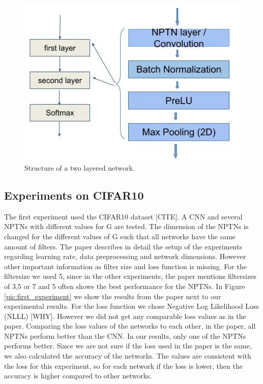 \documentclass{llncs}
\begin{document}
\begin{figure}
	\begin{center}
	\includegraphics[scale=0.35]{result_images/network_structure.jpg}
	\caption{Structure of a two layered network.}
	\label{pic:network_structure}
	\end{center}
\end{figure}

\subsection{Experiments on CIFAR10}
The first experiment used the CIFAR10 dataset [CITE]. A CNN and several NPTNs with different values for G are tested. The dimension of the NPTNs is changed for the different values of G such that all networks have the same amount of filters.
The paper describes in detail the setup of the experiments regarding learning rate, data preprocessing and network dimensions. However other important information as filter size and loss function is missing. 
For the filtersize we used 5, since in the other experiments, the paper mentions  filtersizes of 3,5 or 7 and 5 often shows the best performance for the NPTNs. 
In Figure \ref{pic:first_experiment} we show the results from the paper next to our experimental results. For the loss function we chose Negative Log Likelihood Loss (NLLL) [WHY]. 
However we did not get any comparable loss values as in the paper. Comparing the loss values of the networks to each other, in the paper, all NPTNs perform better than the CNN. In our results, only one of the NPTNs performs better.
Since we are not sure if the loss used in the paper is the same, we also calculated the accuracy of the networks. The values are consistent with the loss for this experiment, so for each network if the loss is lower, then the accuracy is higher compared to other networks.
\end{document}
